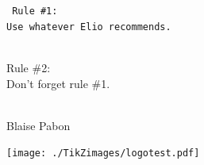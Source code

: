     \centerfleuron{\adfflatleafsolidleft}


    \vfill
    \begin{center}\LARGE\tt
        Rule \#1:\\
        Use whatever Elio recommends.\\
        \strut\\
        Rule \#2:\\
        Don't forget rule \#1.\\
        \strut\\
        \large Blaise Pabon
    \end{center}
    \vfill
    \null

    \clearpage
    

    \clearpage
    \null
    \vfill
    \begin{center}
    \texttt{[image: ./TikZimages/logotest.pdf]}
    \end{center}
    \vfill
    \null

